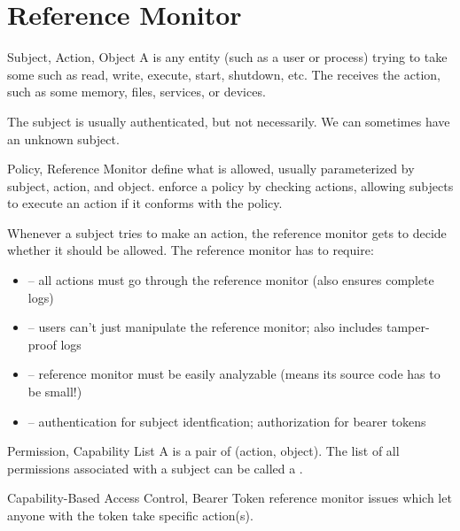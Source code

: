 \documentclass[12pt]{report}
\begin{document}
\section{Reference Monitor}

\begin{dfnbox}{Subject, Action, Object}{}
    A  is any entity (such as a user or process) trying to take some  such as read, write, execute, start, shutdown, etc. The  receives the action, such as some memory, files, services, or devices.
\end{dfnbox}

The subject is usually authenticated, but not necessarily. We can sometimes have an unknown subject.

\begin{dfnbox}{Policy, Reference Monitor}{}
     define what is allowed, usually parameterized by subject, action, and object.  enforce a policy by checking actions, allowing subjects to execute an action if it conforms with the policy.
\end{dfnbox}

Whenever a subject tries to make an action, the reference monitor gets to decide whether it should be allowed. The reference monitor has to require:

\begin{itemize}
    \item {} -- all actions must go through the reference monitor (also ensures complete logs)
    \item {} -- users can't just manipulate the reference monitor; also includes tamper-proof logs
    \item {} -- reference monitor must be easily analyzable (means its source code has to be small!)
    \item {} -- authentication for subject identfication; authorization for bearer tokens
\end{itemize}

\begin{dfnbox}{Permission, Capability List}{}
    A  is a pair of (action, object). The list of all permissions associated with a subject can be called a .
\end{dfnbox}

\begin{dfnbox}{Capability-Based Access Control, Bearer Token}{}
     reference monitor issues  which let anyone with the token take specific action(s).
\end{dfnbox}
\end{document}
